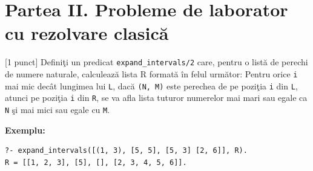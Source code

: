 \documentclass[12pt]{article}
\newcommand{\probex}{\stepcounter{uebno}{\vspace{0.3cm}\noindent \bf (P\arabic{uebno}) }}
\newcommand{\solution}[1]{$\,$ \\ \begin{proof}#1 \qed \end{proof}}
\renewcommand{\solution}[1]{}
\begin{document}
\solution{Presupunem prin reducere la absurd c\u{a} $\cM$ este axiomatizabil\u{a}. A\c sadar, exist\u{a} $\Delta\se Sen_\lc$  \ai 
\bce
(**) \quad pentru orice $\lc$-structur\u{a} $\cA$, \, $\cA\models \Delta$ \ddacam $\cA\in \cM$.
\ece
Fie 
$$\Sigma:=\Gamma\cup \Delta \cup \{\exists^{\geq n}\mid n\geq 1\}.$$

Demonstr\u{a}m c\u{a} $\Sigma$ este satisfiabil\u{a} folosind Teorema de compacitate. 

Fie $\Sigma_0$ o submul\c{t}ime finit\u{a} a lui $\Sigma$. Atunci $$\Sigma_0\se \Gamma \cup \Delta \cup \{\exists^{\geq n_1},
\ldots, \exists^{\geq n_k}\} \quad \text{pentru un } k\in\N. $$

Fie $m:=\max\{n_1,\ldots, n_k\}$. Conform (*), $\Gamma$ are un model finit $\cA$ \ai $|A|\geq m$.  Deoarece $\cA\in \cM$, avem conform (**), c\u a  $\cA\models  \Delta$. 
De asemenea, $\cA\models \exists^{\geq n_i}$ pentru orice $i=1,\ldots, k$. 
Prin urmare, $\cA\models \Gamma \cup \Delta \cup  \{\exists^{\geq n_1},
\ldots, \exists^{\geq n_k}\}$, de unde rezult\u a c\u a $\cA\models \Sigma_0$. A\c sadar, $\Sigma_0$ este satisfiabil\u a.


Aplic\^{a}nd Teorema de compacitate, rezult\u{a} c\u{a}   $\Sigma$ are un model $\cB$. 

Deoarece $\cB\models \Delta$, avem, conform (**), c\u a $\cB\in \cM$. \^In particular,   $\cB$ este finit\u{a}. 

Deoarece $\cB\models \{\exists^{\geq n}\mid n\geq 1\}$,  rezult\u{a} c\u{a} $\cB$ este infinit\u{a}.
 
 Am ob\c{t}inut o contradic\c{t}ie. 
}




\section*{Partea II. Probleme de laborator cu rezolvare clasic\u{a}}
\probex[1 punct]
    Defini\c{t}i un predicat \texttt{expand\_intervals/2} care, pentru o list\u{a} de perechi de numere 
    naturale, calculeaz\u{a} lista R format\u{a} \^{i}n felul urm\u{a}tor:
    Pentru orice \texttt{i} mai mic dec\^{a}t lungimea lui \texttt{L},
    dac\u{a} \texttt{(N, M)} este perechea de pe pozi\c{t}ia \texttt{i} din \texttt{L},
    atunci pe pozi\c{t}ia \texttt{i} din \texttt{R},
    se va afla lista tuturor numerelor mai mari sau egale ca \texttt{N} \c{s}i mai mici sau egale 
    cu \texttt{M}.

    \textbf{Exemplu:}
\begin{verbatim}
?- expand_intervals([(1, 3), [5, 5], [5, 3] [2, 6]], R).
R = [[1, 2, 3], [5], [], [2, 3, 4, 5, 6]]. 
\end{verbatim}
\end{document}
